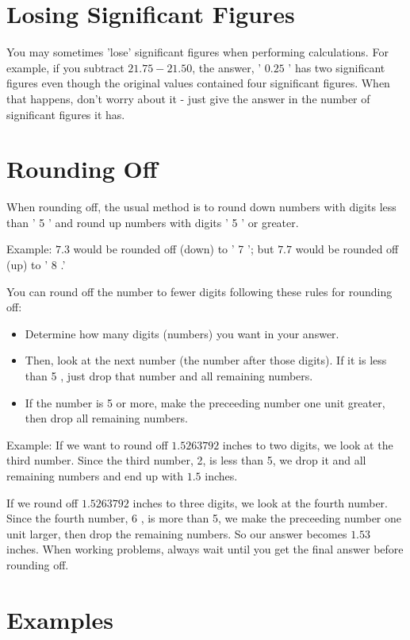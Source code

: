 \documentclass[10pt]{article}
\begin{document}
\section{Losing Significant Figures}
You may sometimes 'lose' significant figures when performing calculations. For example, if you subtract $21.75-21.50$, the answer, ' $0.25$ ' has two significant figures even though the original values contained four significant figures. When that happens, don't worry about it - just give the answer in the number of significant figures it has.

\section{Rounding Off}
When rounding off, the usual method is to round down numbers with digits less than ' 5 ' and round up numbers with digits ' 5 ' or greater.

Example: $7.3$ would be rounded off (down) to ' 7 '; but $7.7$ would be rounded off (up) to ' 8 .'

You can round off the number to fewer digits following these rules for rounding off:

\begin{itemize}
  \item Determine how many digits (numbers) you want in your answer.

  \item Then, look at the next number (the number after those digits). If it is less than 5 , just drop that number and all remaining numbers.

  \item If the number is 5 or more, make the preceeding number one unit greater, then drop all remaining numbers.

\end{itemize}
Example: If we want to round off $1.5263792$ inches to two digits, we look at the third number. Since the third number, 2, is less than 5, we drop it and all remaining numbers and end up with $1.5$ inches.

If we round off $1.5263792$ inches to three digits, we look at the fourth number. Since the fourth number, 6 , is more than 5, we make the preceeding number one unit larger, then drop the remaining numbers. So our answer becomes $1.53$ inches. When working problems, always wait until you get the final answer before rounding off.

\section{Examples}
\end{document}
